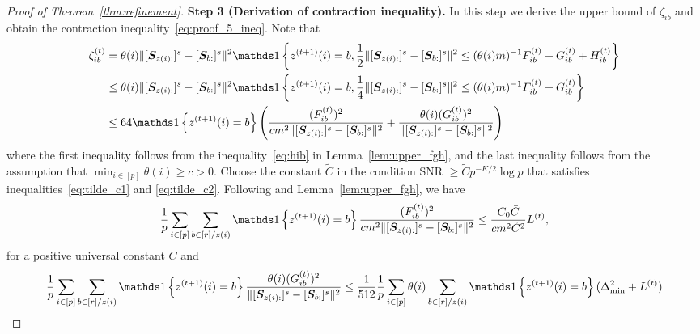 \documentclass[lettersize,onecolumn,journal]{IEEEtran}
\theoremstyle{definition}
\theoremstyle{definition}
\newcommand{\of}[1]{\left(#1\right)}
\newcommand{\offf}[1]{\left\{#1\right\}}
\begin{document}
\begin{proof}[Proof of Theorem~\ref{thm:refinement}]
    {\bf Step 3 (Derivation of contraction inequality).} In this step we derive the upper bound of $\zeta_{ib}$ and obtain the contraction inequality~\eqref{eq:proof_5_ineq}. Note that 
    \begin{align}
        \zeta_{ib}^{(t)} &= \theta(i) \onormSize{}{ [ \mS_{ z(i):}  ]^s - [ \mS_{b:}  ]^s  }^2 \ind \offf{z^{(t+1)}(i) = b, \frac{1}{2}\onormSize{}{ [ \mS_{z(i):}  ]^s - [ \mS_{b:}  ]^s  }^2 \leq (\theta(i) m)^{-1} F_{ib}^{(t)} + G_{ib}^{(t)} + H_{ib}^{(t)} }\\
        & \leq \theta(i) \onormSize{}{ [ \mS_{ z(i):}  ]^s - [ \mS_{b:}  ]^s  }^2 \ind \offf{z^{(t+1)}(i) = b, \frac{1}{4}\onormSize{}{ [ \mS_{z(i):}  ]^s - [ \mS_{b:}  ]^s  }^2 \leq (\theta(i) m)^{-1} F_{ib}^{(t)} + G_{ib}^{(t)} } \\
        & \leq 64 \ind \offf{ z^{(t+1)}(i) = b} \of{  \frac{(F_{ib}^{(t)})^2}{ cm^2\onormSize{}{ [ \mS_{z(i):}  ]^s - [ \mS_{b:}  ]^s  }^2} + \frac{\theta(i)(G_{ib}^{(t)})^2}{ \onormSize{}{ [ \mS_{z(i):}  ]^s - [ \mS_{b:}  ]^s  }^2}    }
    \end{align}
    where the first inequality follows from the inequality~\eqref{eq:hib} in Lemma~\ref{lem:upper_fgh}, and the last inequality follows from the assumption that $\min_{i \in [p]} \theta(i) \geq c>0$. Choose the constant $\tilde C$ in the condition SNR $\geq \tilde C p^{-K/2} \log p$ that satisfies inequalities~\eqref{eq:tilde_c1} and \eqref{eq:tilde_c2}. Following \citet[Step 4, Proof of Theorem 2]{han2020exact} and Lemma~\ref{lem:upper_fgh}, we have 
    \begin{align}\label{eq:f_sum}
          \frac{1}{p} \sum_{i \in [p]}\sum_{b \in [r]/z(i)} \ind \offf{ z^{(t+1)}(i) = b} \frac{(F_{ib}^{(t)})^2}{ cm^2 \onormSize{}{ [ \mS_{z(i):}  ]^s - [ \mS_{b:}  ]^s  }^2} \leq \frac{C_0 \bar C}{c m^2 \tilde C^2} L^{(t)},
    \end{align}
   for a positive universal constant $C$ and 
    \begin{align}
         \frac{1}{p} \sum_{i \in [p]}\sum_{b \in [r]/z(i)} \ind \offf{ z^{(t+1)}(i) = b} \frac{\theta(i)(G_{ib}^{(t)})^2}{ \onormSize{}{ [ \mS_{z(i):}  ]^s - [ \mS_{b:}  ]^s  }^2}  &\leq \frac{1}{512} \frac{1}{p} \sum_{i \in [p]}\theta(i) \sum_{b \in [r]/z(i)}   \ind \offf{ z^{(t+1)}(i) = b}  (\Delta_{\min}^2 + L^{(t)}) \\

\end{align}
\end{proof}
\end{document}
